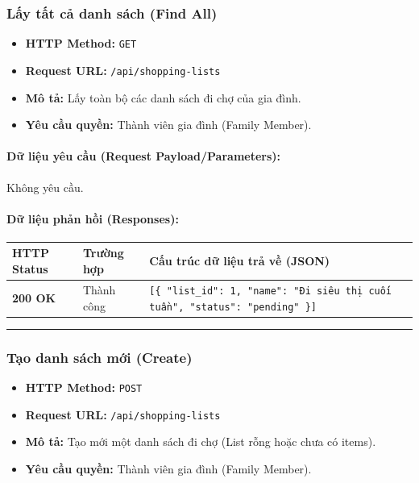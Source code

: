 \documentclass[12pt,a4paper]{article}
\begin{document}
\subsubsection{Lấy tất cả danh sách (Find All)}
\begin{itemize}[leftmargin=*]
    \item \textbf{HTTP Method:} \texttt{GET}
    \item \textbf{Request URL:} \texttt{/api/shopping-lists}
    \item \textbf{Mô tả:} Lấy toàn bộ các danh sách đi chợ của gia đình.
    \item \textbf{Yêu cầu quyền:} Thành viên gia đình (Family Member).
\end{itemize}

\paragraph{Dữ liệu yêu cầu (Request Payload/Parameters):}
Không yêu cầu.\\

\paragraph{Dữ liệu phản hồi (Responses):}
\begin{longtable}{|p{2.8cm}|p{3.2cm}|p{8.0cm}|}
\hline
\textbf{HTTP Status} & \textbf{Trường hợp} & \textbf{Cấu trúc dữ liệu trả về (JSON)} \\ \hline
\endhead
\textbf{200 OK} & Thành công & \texttt{[\{ "list\_id": 1, "name": "Đi siêu thị cuối tuần", "status": "pending" \}]} \\ \hline
\end{longtable}

\vskip 0.4cm
\noindent\rule{\textwidth}{0.3pt}
\vskip 0.4cm

\subsubsection{Tạo danh sách mới (Create)}
\begin{itemize}[leftmargin=*]
    \item \textbf{HTTP Method:} \texttt{POST}
    \item \textbf{Request URL:} \texttt{/api/shopping-lists}
    \item \textbf{Mô tả:} Tạo mới một danh sách đi chợ (List rỗng hoặc chưa có items).
    \item \textbf{Yêu cầu quyền:} Thành viên gia đình (Family Member).
\end{itemize}
\end{document}
